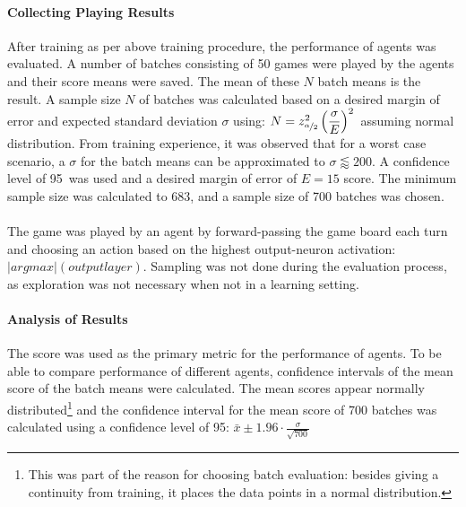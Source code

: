 \documentclass[11pt, fleqn]{article}
\begin{document}
\paragraph{Collecting Playing Results} After training as per above training procedure, the performance of agents was evaluated. A number of batches consisting of 50 games were played by the agents and their score means were saved. The mean of these $N$  batch means is the result. A sample size $N$ of  batches was calculated based on a desired margin of error and expected standard deviation $\sigma $ using: $ N =z_{\nicefrac{\alpha}{2}}^2\left(\dfrac{\sigma}{E}\right)^2 $\ assuming normal distribution. From training experience, it was observed that for a worst case scenario, a $\sigma$ for the batch means can be approximated to $\sigma \lessapprox 200$.  A confidence level of 95\pro\ was used and a desired margin of error of $E=15$ score. The minimum sample size was calculated to 683, and a sample size of 700 batches was chosen.\\\\
The game was played by an agent by forward-passing the game board each turn and choosing an action based on the highest output-neuron activation: $|argmax|(outputlayer)$. Sampling was not done during the evaluation process, as exploration was not necessary when not in a learning setting.
\paragraph{Analysis of Results}
The score was used as the primary metric for the performance of agents. To be able to compare performance of different agents, confidence intervals of the mean score of the batch means were calculated. The mean scores appear normally distributed\footnote{This was part of the reason for choosing batch evaluation: besides giving a continuity from training, it places the data points in a normal distribution.} and the confidence interval for the mean score of 700 batches was calculated using a confidence level of 95\pro:
$
\bar{x} \pm 1.96\cdot  \frac{\sigma}{\sqrt {700}}
$
 




\end{document}
